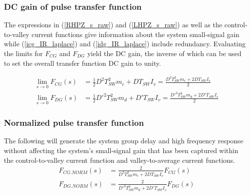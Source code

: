 \documentclass{scrartcl}
\begin{document}
		\subsubsection{DC gain of pulse transfer function}
		The expressions in (\ref{RHPZ_s_raw}) and (\ref{LHPZ_s_raw}) as well as the control-to-valley current functions give information about the system small-signal gain while (\ref{icg_IR_laplace}) and (\ref{idg_IR_laplace}) include redundancy. Evaluating the limits for $F_{CG}$ and $F_{DG}$ yield the DC gain, the inverse of which can be used to set the overall transfer function DC gain to unity.
		
		\begin{align}
		\lim_{s \to 0} F_{CG}(s) &= \frac{1}{2} D^2 T_{SW}^2m_c + D T_{SW} I_v = \frac{D^2 T_{SW}^2m_c + 2D T_{SW} I_v}{2} \label{lim_FCG} \\
		\lim_{s \to 0} F_{DG}(s) &= \frac{1}{2} D'^2 T_{SW}^2m_d + D' T_{SW} I_v= \frac{D'^2 T_{SW}^2m_d + 2D' T_{SW} I_v}{2} \label{lim_FDG}
		\end{align}
		
		\subsubsection{Normalized pulse transfer function}
		The following will generate the system group delay and high frequency response without affecting the system's small-signal gain that has been captured within the control-to-valley current function and valley-to-average current functions. 
		\begin{align}
		F_{CG.NORM}(s) &= \frac{2}{D^2 T_{SW}^2m_c + 2D T_{SW} I_v} F_{CG}(s)\label{FCG_NORM} \\
		F_{DG.NORM}(s) &= \frac{2}{D'^2 T_{SW}^2m_d + 2D' T_{SW} I_v}F_{DG}(s) \label{lim_FDG}
		\end{align}

	
\end{document}
